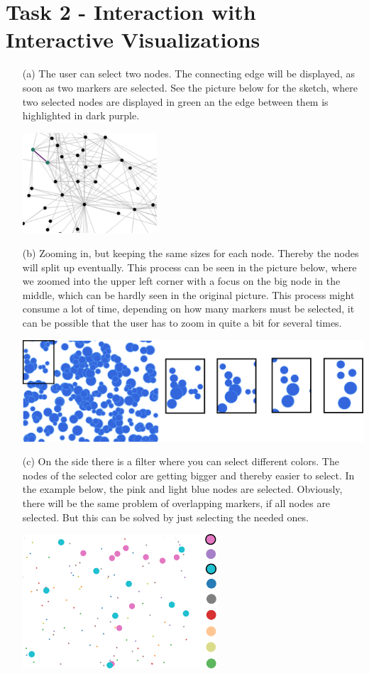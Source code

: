 \documentclass[a4paper]{article}
\begin{document}
\section*{Task 2 - Interaction with Interactive Visualizations}
\begin{enumerate}
	\item[(a)]The user can select two nodes. The connecting edge will be displayed, as soon as two markers are selected.
	See the picture below for the sketch, where two selected nodes are displayed in green an the edge between them is highlighted in dark purple.
	
	\includegraphics[width=5cm]{2a.png}
	
	\item[(b)]Zooming in, but keeping the same sizes for each node. Thereby the nodes will split up eventually. This process can be seen in the picture below, where we zoomed into the upper left corner with a focus on the big node in the middle, which can be hardly seen in the original picture.
	This process might consume a lot of time, depending on how many markers must be selected, it can be possible that the user has to zoom in quite a bit for several times. 
	
	\includegraphics[width=\linewidth]{2b.png}
	
	\item[(c)]On the side there is a filter where you can select different colors. 
	The nodes of the selected color are getting bigger and thereby easier to select. 
	In the example below, the pink and light blue nodes are selected. 
	Obviously, there will be the same problem of overlapping markers, if all nodes are selected. 
	But this can be solved by just selecting the needed ones. 
	
	\includegraphics[height=5cm]{2c2.png}
\end{enumerate}
\end{document}
